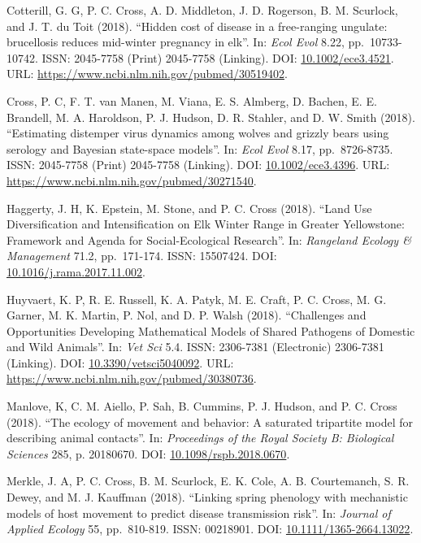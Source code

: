 \documentclass[12pt,]{article}
\begin{document}
Cotterill, G. G, P. C. Cross, A. D. Middleton, J. D. Rogerson, B. M.
Scurlock, and J. T. du Toit (2018). ``Hidden cost of disease in a
free-ranging ungulate: brucellosis reduces mid-winter pregnancy in
elk''. In: \emph{Ecol Evol} 8.22, pp.~10733-10742. ISSN: 2045-7758
(Print) 2045-7758 (Linking). DOI:
\href{https://doi.org/10.1002\%2Fece3.4521}{10.1002/ece3.4521}. URL:
\url{https://www.ncbi.nlm.nih.gov/pubmed/30519402}.

Cross, P. C, F. T. van Manen, M. Viana, E. S. Almberg, D. Bachen, E. E.
Brandell, M. A. Haroldson, P. J. Hudson, D. R. Stahler, and D. W. Smith
(2018). ``Estimating distemper virus dynamics among wolves and grizzly
bears using serology and Bayesian state-space models''. In: \emph{Ecol
Evol} 8.17, pp.~8726-8735. ISSN: 2045-7758 (Print) 2045-7758 (Linking).
DOI: \href{https://doi.org/10.1002\%2Fece3.4396}{10.1002/ece3.4396}.
URL: \url{https://www.ncbi.nlm.nih.gov/pubmed/30271540}.

Haggerty, J. H, K. Epstein, M. Stone, and P. C. Cross (2018). ``Land Use
Diversification and Intensification on Elk Winter Range in Greater
Yellowstone: Framework and Agenda for Social-Ecological Research''. In:
\emph{Rangeland Ecology \& Management} 71.2, pp.~171-174. ISSN:
15507424. DOI:
\href{https://doi.org/10.1016\%2Fj.rama.2017.11.002}{10.1016/j.rama.2017.11.002}.

Huyvaert, K. P, R. E. Russell, K. A. Patyk, M. E. Craft, P. C. Cross, M.
G. Garner, M. K. Martin, P. Nol, and D. P. Walsh (2018). ``Challenges
and Opportunities Developing Mathematical Models of Shared Pathogens of
Domestic and Wild Animals''. In: \emph{Vet Sci} 5.4. ISSN: 2306-7381
(Electronic) 2306-7381 (Linking). DOI:
\href{https://doi.org/10.3390\%2Fvetsci5040092}{10.3390/vetsci5040092}.
URL: \url{https://www.ncbi.nlm.nih.gov/pubmed/30380736}.

Manlove, K, C. M. Aiello, P. Sah, B. Cummins, P. J. Hudson, and P. C.
Cross (2018). ``The ecology of movement and behavior: A saturated
tripartite model for describing animal contacts''. In: \emph{Proceedings
of the Royal Society B: Biological Sciences} 285, p. 20180670. DOI:
\href{https://doi.org/10.1098\%2Frspb.2018.0670}{10.1098/rspb.2018.0670}.

Merkle, J. A, P. C. Cross, B. M. Scurlock, E. K. Cole, A. B.
Courtemanch, S. R. Dewey, and M. J. Kauffman (2018). ``Linking spring
phenology with mechanistic models of host movement to predict disease
transmission risk''. In: \emph{Journal of Applied Ecology} 55,
pp.~810-819. ISSN: 00218901. DOI:
\href{https://doi.org/10.1111\%2F1365-2664.13022}{10.1111/1365-2664.13022}.
\end{document}
